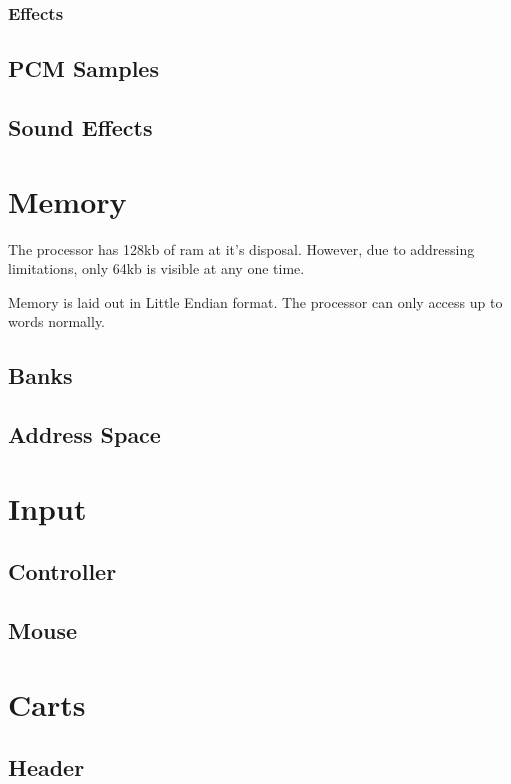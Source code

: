 \documentclass[10pt,a4paper]{article}
\begin{document}
			\subsubsection{Effects}
		\subsection{PCM Samples}
		\subsection{Sound Effects}
		
		
					
	\section{Memory}
	The processor has 128kb of ram at it's disposal. However, due to addressing limitations, only 64kb is visible at any one time.
	
	Memory is laid out in Little Endian format. The processor can only access up to words normally.
		\subsection{Banks}
		\subsection{Address Space}
					
	\section{Input}
		\subsection{Controller}
		\subsection{Mouse}
			
	\section{Carts}
		\subsection{Header}
\end{document}
